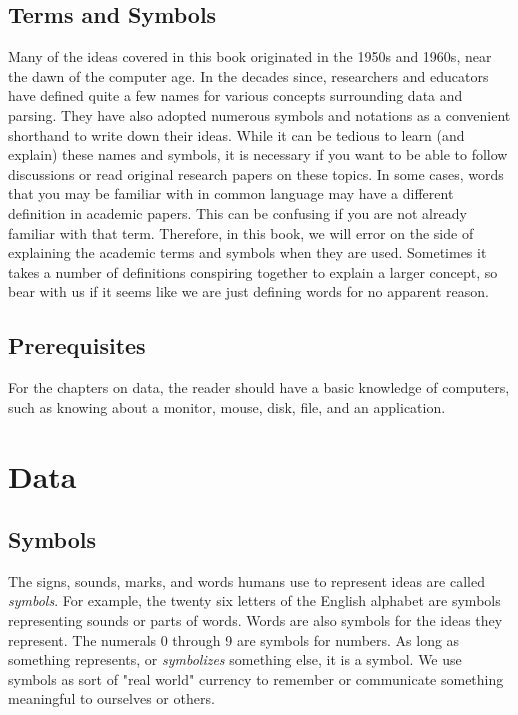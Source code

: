 \documentclass{book}
\newcommand{\newterm}[2]{\textit{#1}\index{#2}}
\begin{document}
\section*{Terms and Symbols}
Many of the ideas covered in this book originated in the 1950s and 
1960s, near the dawn of the computer age. In the decades since,
researchers and educators have defined quite a few names for various
concepts surrounding data and parsing. They have also adopted numerous
symbols and notations as a convenient shorthand to write down their ideas.
While it can be tedious to learn (and explain) these names and symbols, it
is necessary if you want to be able to follow discussions or read
original research papers on these topics. In some cases, words that you may
be familiar with in common language may have a different definition in 
academic papers. This can be confusing if you are not already familiar with
that term. Therefore, in this book, we will error on the side of explaining
the academic terms and symbols when they are used. Sometimes it takes a 
number of definitions conspiring together to explain a larger concept, so
bear with us if it seems like we are just defining words for no apparent
reason.

\section*{Prerequisites}
For the chapters on data, the reader should have a basic knowledge of
computers, such as knowing about a monitor, mouse, disk, file, and an
application.

\setcounter{tocdepth}{3}
\tableofcontents

\mainmatter

\chapter{Data}\label{ch.Data}

\section{Symbols}
The signs, sounds, marks, and words humans use to represent ideas are called
\newterm{symbols}{Symbol}. For example, the twenty six letters of
the English alphabet are symbols representing sounds or parts of words. Words
are also symbols for the ideas they represent. 
The numerals 0 through 9 are symbols for numbers.
As long as something represents, or \textit{symbolizes} something else, 
it is a symbol. We use symbols as sort of "real world" currency
to remember or communicate something meaningful to ourselves or others.
\end{document}
